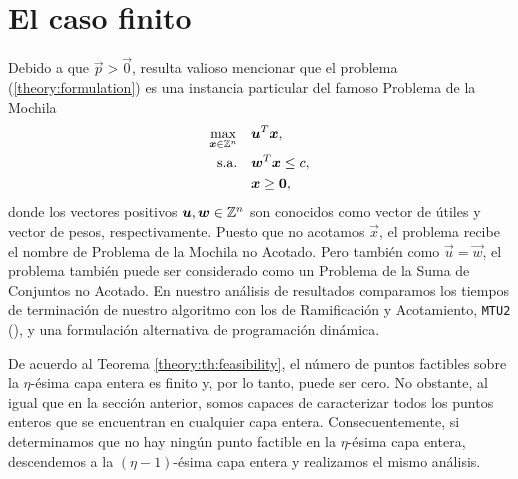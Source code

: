 \chapter{El caso finito}
\noindent
Debido a que $\vec{p} > \vec{0}$, resulta valioso mencionar que el problema
(\ref{theory:formulation}) es una instancia particular del famoso Problema de la Mochila
\begin{subequations}
	\label{knapsack-formulation}
	\begin{align}
		\max_{\boldsymbol{x} \in \mathbb{Z}^n} \quad
			& \boldsymbol{u}^T\boldsymbol{x}, \\
		\text{s.a.} \quad
			& \boldsymbol{w}^T\boldsymbol{x} \leq c, \\
			& \boldsymbol{x} \geq \boldsymbol{0},
	\end{align}
\end{subequations}
donde los vectores positivos $\boldsymbol{u}, \boldsymbol{w} \in \mathbb{Z}^n$ son conocidos como vector de útiles y
vector de pesos, respectivamente. Puesto que no acotamos $\vec{x}$, el problema recibe el nombre de
Problema de la Mochila no Acotado. Pero también como $\vec{u} = \vec{w}$, el problema
también puede ser considerado como un Problema de la Suma de Conjuntos no Acotado. En nuestro análisis
de resultados comparamos los tiempos de terminación de nuestro algoritmo con los de Ramificación y
Acotamiento, \texttt{MTU2} (\cite{martello}), y una formulación alternativa de programación dinámica.

De acuerdo al Teorema \ref{theory:th:feasibility}, el número de puntos factibles sobre la
$\eta$-ésima capa entera es finito y, por lo tanto, puede ser cero. No obstante, al igual que en la
sección anterior, somos capaces de caracterizar todos los puntos enteros que se encuentran en
cualquier capa entera. Consecuentemente, si determinamos que no hay ningún punto factible en la
$\eta$-ésima capa entera, descendemos a la $(\eta -1)$-ésima capa entera y realizamos el mismo
análisis.

